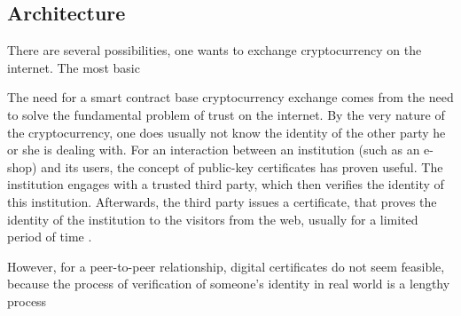 \subsection{Architecture}
% 
There are several possibilities, one wants to exchange cryptocurrency on the internet. The most basic

The need for a smart contract base cryptocurrency exchange comes from the need to solve the fundamental problem of trust on the internet. By the very nature of the cryptocurrency, one does usually not know the identity of the other party he or she is dealing with. For an interaction between an institution (such as an e-shop) and its users, the concept of public-key certificates has proven useful. The institution engages with a trusted third party, which then verifies the identity of this institution. Afterwards, the third party issues a certificate, that proves the identity of the institution to the visitors from the web, usually for a limited period of time \cite{Lee2013SecurityArchitects}. 

However, for a peer-to-peer relationship, digital certificates do not seem feasible, because the process of verification of someone's identity in real world is a lengthy process